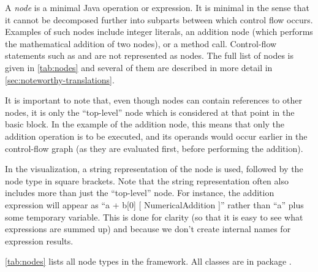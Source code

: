 \begin{definition}[Nodes]
    \label{def:node}
    A \emph{node} is a minimal Java operation or expression.  It is
    minimal in the sense that it cannot be decomposed further into
    subparts between which control flow occurs. Examples of such
    nodes include integer literals, an addition node (which performs
    the mathematical addition of two nodes), or a method call.  Control-flow
    statements such as  and  are not represented as
    nodes.  The full list of nodes is given in \autoref{tab:nodes} and
    several of them are described in more detail in
    \autoref{sec:noteworthy-translations}.

    It is important to note that, even though nodes can contain
    references to other nodes, it is only the ``top-level'' node which
    is considered at that point in the basic block. In the example of
    the addition node, this means that only the addition operation is
    to be executed, and its operands would occur earlier in the
    control-flow graph (as they are evaluated first, before performing
    the addition).
\end{definition}

In the visualization, a string representation of the node is used,
followed by the node type in square brackets. Note that the string
representation often also includes more than just the ``top-level''
node. For instance, the addition expression  will
appear as ``a + b[0] [ NumericalAddition ]'' rather than ``a'' plus
some temporary variable.  This is done for clarity (so that it is easy
to see what expressions are summed up) and because we don't create
internal names for expression results.

\autoref{tab:nodes} lists all node types in the framework.
All classes are in package .

\newcommand{\nodetype}[1]{\code{#1}}

